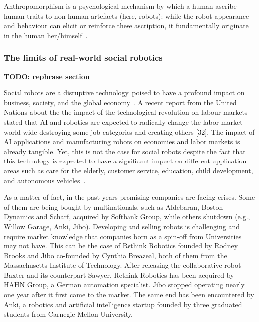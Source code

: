 \documentclass[11pt,a4paper]{report}
\newcommand{\TODO}[1]{{\color{red}\textbf{TODO: #1}}}
\begin{document}
Anthropomorphism is a psychological mechanism by which a human
ascribe human traits to non-human artefacts (here, robots): while the
robot appearance and behaviour can elicit or reinforce these ascription,
it fundamentally originate in the human her/himself~\cite{fink}.





\subsubsection{The limits of real-world social robotics}

\TODO{rephrase section}

Social robots are a disruptive technology, poised to have a profound impact on
business, society, and the global economy~\cite{williams2020social}. A recent report from the United
Nations about the the impact of the technological revolution on labour markets
stated that AI and robotics are expected to radically change the labor market
world-wide destroying some job categories and creating others [32]. The impact
of AI applications and manufacturing robots on economies and labor markets is
already tangible. Yet, this is not the case for social robots despite the fact that
this technology is expected to have a significant impact on different application
areas such as care for the elderly, customer service, education, child development,
and autonomous vehicles~\cite{baillie2019challenges}.

As a matter of fact, in the past years promising companies are facing crises.
Some of them are being bought by multinationals, such as Aldebaran, Boston
Dynamics and Scharf, acquired by Softbank Group, while others shutdown (e.g.,
Willow Garage, Anki, Jibo). Developing and selling robots is challenging and
require market knowledge that companies born as a spin-off from Universities may
not have. This can be the case of Rethink Robotics founded by Rodney Brooks and
Jibo co-founded by Cynthia Breazeal, both of them from the Massachusetts
Institute of Technology. After releasing the collaborative robot Baxter and its
counterpart Sawyer, Rethink Robotics has been acquired by HAHN Group, a German
automation specialist. Jibo stopped operating nearly one year after it first
came to the market. The same end has been encountered by Anki, a robotics and
artificial intelligence startup founded by three graduated students from
Carnegie Mellon University.
\end{document}
